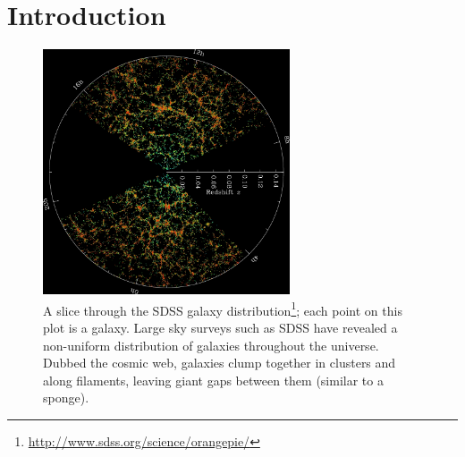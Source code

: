 \chapter{Introduction}



\begin{figure}
    \includegraphics[width=0.65\textwidth]{Images/Intro/sdss}
    \caption[SDSS galaxy map]{A slice through the SDSS galaxy 
    distribution\footnote{\url{http://www.sdss.org/science/orangepie/}}; each 
    point on this plot is a galaxy.  Large sky surveys such as SDSS have 
    revealed a non-uniform distribution of galaxies throughout the universe.  
    Dubbed the cosmic web, galaxies clump together in clusters and along 
    filaments, leaving giant gaps between them (similar to a sponge).}
    \label{fig:SDSS_map}
\end{figure}

